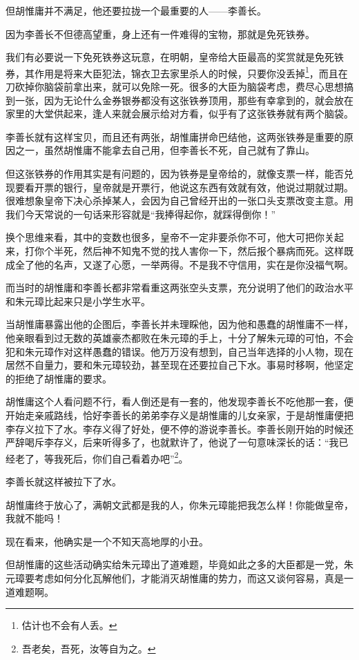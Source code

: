 \begin{multicols}{\theparacolNo}
		但胡惟庸并不满足，他还要拉拢一个最重要的人——李善长。

		因为李善长不但德高望重，身上还有一件难得的宝物，那就是免死铁券。

		我们有必要说一下免死铁券这玩意，在明朝，皇帝给大臣最高的奖赏就是免死铁券，其作用是将来大臣犯法，锦衣卫去家里杀人的时候，只要你没丢掉\footnote{估计也不会有人丢。}，而且在刀砍掉你脑袋前拿出来，就可以免除一死。很多的大臣为脑袋考虑，费尽心思想搞到一张，因为无论什么金券银券都没有这张铁券顶用，那些有幸拿到的，就会放在家里的大堂供起来，逢人来就会展示给对方看，似乎有了这张铁券就有两个脑袋。

		李善长就有这样宝贝，而且还有两张，胡惟庸拼命巴结他，这两张铁券是重要的原因之一，虽然胡惟庸不能拿去自己用，但李善长不死，自己就有了靠山。

		但这张铁券的作用其实是有问题的，因为铁券是皇帝给的，就像支票一样，能否兑现要看开票的银行，皇帝就是开票行，他说这东西有效就有效，他说过期就过期。很难想象皇帝下决心杀掉某人，会因为自己曾经开出的一张口头支票改变主意。用我们今天常说的一句话来形容就是“我捧得起你，就踩得倒你！”

		换个思维来看，其中的变数也很多，皇帝不一定非要杀你不可，他大可把你关起来，打你个半死，然后神不知鬼不觉的找人害你一下，然后报个暴病而死。这样既成全了他的名声，又遂了心愿，一举两得。不是我不守信用，实在是你没福气啊。

		而当时的胡惟庸和李善长都非常看重这两张空头支票，充分说明了他们的政治水平和朱元璋比起来只是小学生水平。

		当胡惟庸暴露出他的企图后，李善长并未理睬他，因为他和愚蠢的胡惟庸不一样，他亲眼看到过无数的英雄豪杰都败在朱元璋的手上，十分了解朱元璋的可怕，不会犯和朱元璋作对这样愚蠢的错误。他万万没有想到，自己当年选择的小人物，现在居然不自量力，要和朱元璋较劲，甚至现在还要拉自己下水。事易时移啊，他坚定的拒绝了胡惟庸的要求。

		胡惟庸这个人看问题不行，看人倒还是有一套的，他发现李善长不吃他那一套，便开始走亲戚路线，恰好李善长的弟弟李存义是胡惟庸的儿女亲家，于是胡惟庸便把李存义拉下了水。李存义得了好处，便不停的游说李善长。李善长刚开始的时候还严辞喝斥李存义，后来听得多了，也就默许了，他说了一句意味深长的话：“我已经老了，等我死后，你们自己看着办吧”\footnote{吾老矣，吾死，汝等自为之。}。

		李善长就这样被拉下了水。

		胡惟庸终于放心了，满朝文武都是我的人，你朱元璋能把我怎么样！你能做皇帝，我就不能吗！

		现在看来，他确实是一个不知天高地厚的小丑。

		但胡惟庸的这些活动确实给朱元璋出了道难题，毕竟如此之多的大臣都是一党，朱元璋要考虑如何分化瓦解他们，才能消灭胡惟庸的势力，而这又谈何容易，真是一道难题啊。


\end{multicols}
